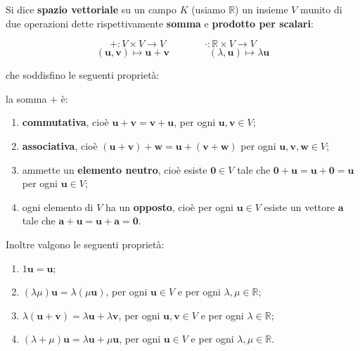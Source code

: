 \documentclass[
  a4paper,
]{article}
\begin{document}
\begin{definitionbox}
Si dice \textbf{spazio vettoriale} su un campo \(K\) (usiamo
\(\mathbb{R}\)) un insieme \(V\) munito di due operazioni dette
rispettivamente \textbf{somma} e \textbf{prodotto per scalari}:

\[
+ : V \times V \longrightarrow V
\qquad\qquad
\cdot : \mathbb{R}\times V \longrightarrow V
\] \[
(\mathbf{u},\mathbf{v}) \longmapsto \mathbf{u}+\mathbf{v}
\qquad\qquad
(\lambda,\mathbf{u}) \longmapsto \lambda\mathbf{u}
\]

che soddisfino le seguenti proprietà:

la somma \(+\) è:

\begin{enumerate}
\def\labelenumi{\arabic{enumi}.}
\item
  \textbf{commutativa}, cioè
  \(\mathbf{u}+\mathbf{v}=\mathbf{v}+\mathbf{u}\), per ogni
  \(\mathbf{u},\mathbf{v}\in V\);
\item
  \textbf{associativa}, cioè
  \((\mathbf{u}+\mathbf{v})+\mathbf{w}=\mathbf{u}+(\mathbf{v}+\mathbf{w})\)
  per ogni \(\mathbf{u},\mathbf{v},\mathbf{w}\in V\);
\item
  ammette un \textbf{elemento neutro}, cioè esiste \(\mathbf{0}\in V\)
  tale che \(\mathbf{0}+\mathbf{u}=\mathbf{u}+\mathbf{0}=\mathbf{u}\)
  per ogni \(\mathbf{u}\in V\);
\item
  ogni elemento di \(V\) ha un \textbf{opposto}, cioè per ogni
  \(\mathbf{u}\in V\) esiste un vettore \(\mathbf{a}\) tale che
  \(\mathbf{a}+\mathbf{u}=\mathbf{u}+\mathbf{a}=\mathbf{0}\).
\end{enumerate}

Inoltre valgono le seguenti proprietà:

\begin{enumerate}
\def\labelenumi{\arabic{enumi}.}
\setcounter{enumi}{4}
\item
  \(1\mathbf{u}=\mathbf{u}\);
\item
  \((\lambda\mu)\mathbf{u}=\lambda(\mu\mathbf{u})\), per ogni
  \(\mathbf{u}\in V\) e per ogni \(\lambda,\mu\in\mathbb{R}\);
\item
  \(\lambda(\mathbf{u}+\mathbf{v})=\lambda\mathbf{u}+\lambda\mathbf{v}\),
  per ogni \(\mathbf{u},\mathbf{v}\in V\) e per ogni
  \(\lambda\in\mathbb{R}\);
\item
  \((\lambda+\mu)\mathbf{u}=\lambda\mathbf{u}+\mu\mathbf{u}\), per ogni
  \(\mathbf{u}\in V\) e per ogni \(\lambda,\mu\in\mathbb{R}\).
\end{enumerate}
\end{definitionbox}
\end{document}
